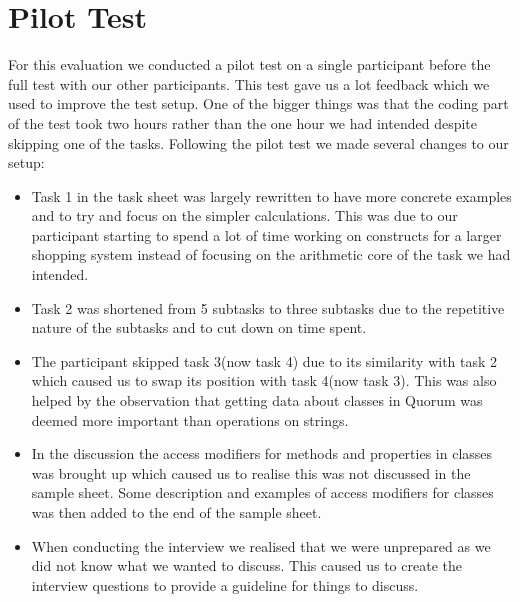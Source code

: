 \section{Pilot Test}
For this evaluation we conducted a pilot test on a single participant before the full test with our other participants.
This test gave us a lot feedback which we used to improve the test setup.
One of the bigger things was that the coding part of the test took two hours rather than the one hour we had intended despite skipping one of the tasks.
Following the pilot test we made several changes to our setup:
\begin{itemize}
\item Task 1 in the task sheet was largely rewritten to have more concrete examples and to try and focus on the simpler calculations.
This was due to our participant starting to spend a lot of time working on constructs for a larger shopping system instead of focusing on the arithmetic core of the task we had intended.
\item Task 2 was shortened from 5 subtasks to three subtasks due to the repetitive nature of the subtasks and to cut down on time spent.
\item The participant skipped task 3(now task 4) due to its similarity with task 2 which caused us to swap its position with task 4(now task 3).
This was also helped by the observation that getting data about classes in Quorum was deemed more important than operations on strings.
\item In the discussion the access modifiers for methods and properties in classes was brought up which caused us to realise this was not discussed in the sample sheet.
Some description and examples of access modifiers for classes was then added to the end of the sample sheet.
\item When conducting the interview we realised that we were unprepared as we did not know what we wanted to discuss.
This caused us to create the interview questions to provide a guideline for things to discuss.
\end{itemize}